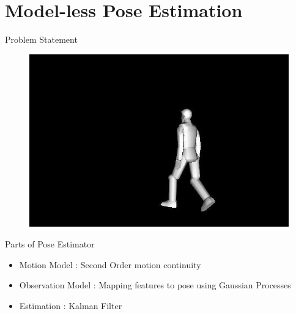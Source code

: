 
\section[Pose Estimation]{Model-less Pose Estimation}
\begin{frame}{Problem Statement}
\begin{figure}
\centering
\includegraphics[height=0.6\linewidth,trim = 60mm 5mm 35mm 20mm,clip]{figures/human_figure3d}
\end{figure}
\end{frame}

\begin{frame}{Parts of Pose Estimator}
\begin{itemize}
\item Motion Model : Second Order motion continuity
\item Observation Model : Mapping features to pose using Gaussian Processes
\item Estimation : Kalman Filter
\end{itemize}
\end{frame}

